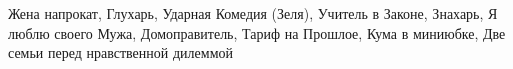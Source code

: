  
 
 
 
 

Жена напрокат, Глухарь, Ударная Комедия (Зеля), Учитель в Законе,
Знахарь, Я люблю своего Мужа, Домоправитель, Тариф на Прошлое, Кума в миниюбке,
Две семьи перед нравственной дилеммой
